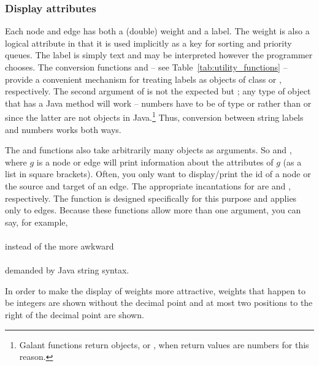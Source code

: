 \subsubsection{Display attributes} \label{sec:display_attributes}

Each node and edge has
both a (double) weight and a label.
The weight
is also a logical
attribute in that
it is used implicitly as a
key for
sorting and priority queues.
The label is simply text and may be interpreted however the programmer
chooses.
The conversion functions 
and 
-- see Table~\ref{tab:utility_functions}
-- provide a convenient mechanism for treating labels as objects of class
 or , respectively.
The second argument of 
is not the expected 
but ;
any type of object that has a Java  method will work
-- numbers have to be of type  or 
rather than  or  since the latter are not objects
in Java.\footnote{
  Galant functions return objects,  or , when
  return values are numbers for this reason.
}
Thus, conversion between string labels and numbers works both ways.

The  and  functions also take arbitrarily many objects as
arguments. So  and , where $g$ is a node
or edge will print information about the attributes of $g$ (as a list in
square brackets). Often, you only want to display/print the id of a node or
the source and target of an edge. The appropriate incantations for
 are  and ,
respectively. The  function is designed specifically for this
purpose and applies only to edges.
Because these functions allow more than one argument, you can say, for
example,\\
\hspace*{3em}\\
instead of the more awkward\\
\hspace*{3em}\\
demanded by Java string syntax.

In order to make the display of weights more attractive, weights that happen
to be integers are shown without the decimal point and at most two positions
to the right of the decimal point are shown.

